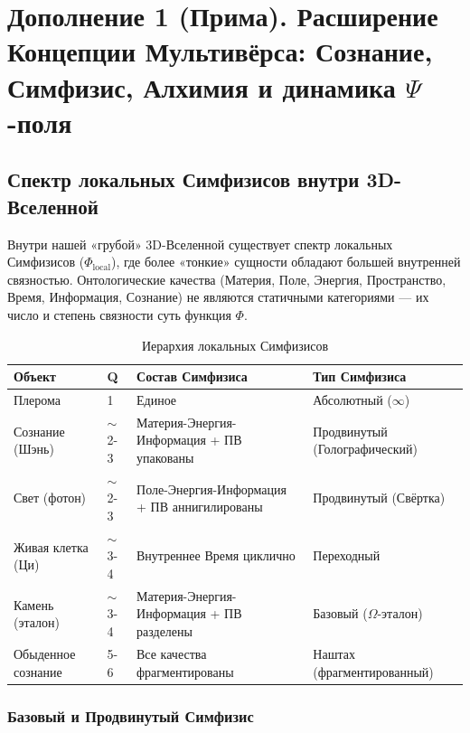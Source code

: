 \documentclass[a4paper,12pt]{article}
\begin{document}
\newpage
\section{Дополнение 1 (Прима). Расширение Концепции Мультивёрса: Сознание, Симфизис, Алхимия и динамика $\Psi$-поля}

\subsection{Спектр локальных Симфизисов внутри 3D-Вселенной}

Внутри нашей «грубой» 3D-Вселенной существует спектр локальных Симфизисов ($\Phi_{\text{local}}$), где более «тонкие» сущности обладают большей внутренней связностью. Онтологические качества (Материя, Поле, Энергия, Пространство, Время, Информация, Сознание) не являются статичными категориями — их число и степень связности суть функция $\Phi$.

\begin{table}[H]
	\centering
	\begin{tabular}{|p{2.8cm}|p{2.2cm}|p{5.5cm}|p{3.5cm}|}
		\hline
		\textbf{Объект} & \textbf{Q} & \textbf{Состав Симфизиса} & \textbf{Тип Симфизиса} \\
		\hline
		Плерома & 1 & Единое & Абсолютный ($\infty$) \\
		\hline
		Сознание (Шэнь) & $\sim$2-3 & Материя-Энергия-Информация + ПВ упакованы & Продвинутый (Голографический) \\
		\hline
		Свет (фотон) & $\sim$2-3 & Поле-Энергия-Информация + ПВ аннигилированы & Продвинутый (Свёртка) \\
		\hline
		Живая клетка (Ци) & $\sim$3-4 & Внутреннее Время циклично & Переходный \\
		\hline
		Камень (эталон) & $\sim$3-4 & Материя-Энергия-Информация + ПВ разделены & Базовый ($\Omega$-эталон) \\
		\hline
		Обыденное сознание & 5-6 & Все качества фрагментированы & Наштах (фрагментированный) \\
		\hline
	\end{tabular}
	\caption{Иерархия локальных Симфизисов}
\end{table}

\subsubsection{Базовый и Продвинутый Симфизис}
\end{document}
